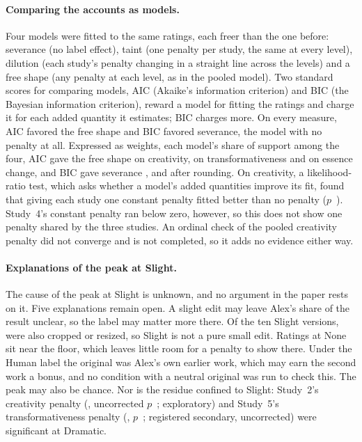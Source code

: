 \paragraph*{Comparing the accounts as models.}
Four models were fitted to the same ratings, each freer than the one before: severance (no label effect), taint (one penalty per study, the same at every level), dilution (each study's penalty changing in a straight line across the levels) and a free shape (any penalty at each level, as in the pooled model). Two standard scores for comparing models, AIC (Akaike's information criterion) and BIC (the Bayesian information criterion), reward a model for fitting the ratings and charge it for each added quantity it estimates; BIC charges more. On every measure, AIC favored the free shape and BIC favored severance, the model with no penalty at all. Expressed as weights, each model's share of support among the four, AIC gave the free shape \XSCreatFreeShapeAICWeight{} on creativity, \XSTransFreeShapeAICWeight{} on transformativeness and \XSEssFreeShapeAICWeight{} on essence change, and BIC gave severance \XSCreatSeveranceBICWeight, \XSTransSeveranceBICWeight{} and \XSEssSeveranceBICWeight{} after rounding. On creativity, a likelihood-ratio test, which asks whether a model's added quantities improve its fit, found that giving each study one constant penalty fitted better than no penalty ($p$~\XSCreatTaintLRTP). Study~4's constant penalty ran below zero, however, so this does not show one penalty shared by the three studies. An ordinal check of the pooled creativity penalty did not converge and is not completed, so it adds no evidence either way.

\paragraph*{Explanations of the peak at Slight.}
The cause of the peak at Slight is unknown, and no argument in the paper rests on it. Five explanations remain open. A slight edit may leave Alex's share of the result unclear, so the label may matter more there. Of the ten Slight versions, \XSImageCheckSlightReframedN{} were also cropped or resized, so Slight is not a pure small edit. Ratings at None sit near the floor, which leaves little room for a penalty to show there. Under the Human label the original was Alex's own earlier work, which may earn the second work a bonus, and no condition with a neutral original was run to check this. The peak may also be chance. Nor is the residue confined to Slight: Study~2's creativity penalty (\STwoCreatPenaltyDramaticEst, uncorrected $p$~\STwoCreatPenaltyDramaticP; exploratory) and Study~5's transformativeness penalty (\SFiveTransPenaltyDramaticEst, $p$~\SFiveTransPenaltyDramaticP; registered secondary, uncorrected) were significant at Dramatic.
